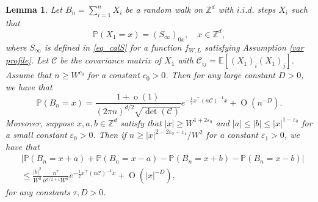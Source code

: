 \documentclass{article}
\newcommand{\1}{\mathds{1}}
\numberwithin{equation}{section}
\newcommand{\be}{\begin{equation}}
\newcommand{\ee}{\end{equation}}
\newcommand{\e}{{\varepsilon}}
\renewcommand{\cal}{\mathcal}
\renewcommand{\leq}{\leqslant}
\renewcommand{\geq}{\geqslant}
\renewcommand{\le}{\leq}
\renewcommand{\ge}{\geq}
\newcommand{\Z}{\mathbb{Z}}
\DeclareMathOperator{\OO}{O}
\DeclareMathOperator{\oo}{o}
\theoremstyle{plain} %
\newtheorem{lemma}[theorem]{Lemma}
\theoremstyle{remark}
\begin{document}
\begin{lemma}\label{reg RW2} 
 Let $B_n = \sum_{i=1}^n X_i$ be a random walk on $\mathbb Z^d$ with $i.i.d.$ steps $X_i$ such that \begin{equation*}%
\mathbb P(X_1=x) = (S_\infty)_{0x}, \quad x\in \Z^d, %
\end{equation*}
where $S_\infty$ is defined in \eqref{eq_calS} for a function $f_{W,L}$ satisfying Assumption \ref{var profile}. 
Let $\cal C$ be the covariance matrix of $X_1$ with $\cal C_{ij}=\mathbb E [ (X_1)_i (X_1)_j ]$. Assume that $ n \ge   W^{c_0}$  for a constant $c_0>0$. Then for any large constant $D>0$, we have that
\be\label{RW_diffusion2}
\mathbb P\left(B_n = x\right) = \frac{1+\oo(1)}{(2\pi n)^{d/2} \sqrt{\det(\cal C)}}e^{-\frac1{2} x^\top (n\cal C)^{-1} x}+\OO(n^{-D}).
\ee
Moreover, suppose $x, a,b\in \Z^d$ satisfy that $|x|\ge W^{1+2\e_0}$ and $|a|\le |b| \le |x|^{1-\e_0}$ for a small constant $\e_0>0$. Then if $n\ge {|x|^{2-2\e_0+\e_1}}/{W^2}$ for a constant $\e_1>0$, we have that
\be\label{RW_diffusion1}
\begin{split}
&\left| \mathbb P\left(B_n = x + a\right) + \mathbb P\left(B_n = x - a \right) - \mathbb P\left(B_n = x + b\right)- \mathbb P\left(B_n = x - b\right) \right| \\
&\le   \frac{| b |^2}{W^2} \frac{n^\tau}{n^{d/2+1}W^d}e^{-\frac1{2} x^\top (n\cal C)^{-1} x}+\OO(|x|^{-D}),
\end{split}
\ee
for any constants $\tau, D>0$.
\end{lemma}
\end{document}
